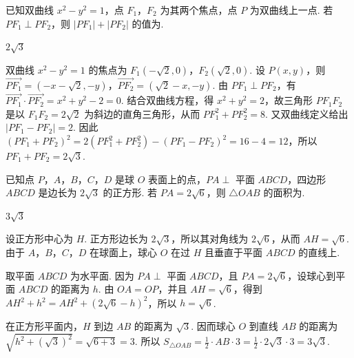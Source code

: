 \begin{problem}
已知双曲线 \(x^{2} - y^{2} = 1\)，点 \(F_{1}\)，\(F_{2}\) 为其两个焦点，点 \(P\) 为双曲线上一点. 若 \(PF_{1} \perp PF_{2}\)，则 \(|PF_{1}| + |PF_{2}|\) 的值为\fillinblank{}.
\end{problem}

\begin{answer}
\(2\sqrt{3}\)
\end{answer}

\begin{solution}
双曲线 \(x^2-y^2=1\) 的焦点为 \(F_1\left(-\sqrt{2},0\right)\)，\(F_2\left(\sqrt{2},0\right)\). 设 \(P(x,y)\)，则
\(\overrightarrow{PF_1}=\left(-x-\sqrt{2},-y\right)\)，\(\overrightarrow{PF_2}=\left(\sqrt{2}-x,-y\right)\). 由 \(PF_1\perp PF_2\)，有
\(\overrightarrow{PF_1}\cdot\overrightarrow{PF_2}=x^2+y^2-2=0\). 结合双曲线方程，得 \(x^2+y^2=2\)，故三角形 \(PF_1F_2\) 是以 \(F_1F_2=2\sqrt{2}\) 为斜边的直角三角形，从而 \(PF_1^2+PF_2^2=8\). 又双曲线定义给出 \(\left|PF_1-PF_2\right|=2\). 因此 \(\left(PF_1+PF_2\right)^2=2\left(PF_1^2+PF_2^2\right)-\left(PF_1-PF_2\right)^2=16-4=12\)，所以 \(PF_1+PF_2=2\sqrt{3}\).
\end{solution}

\begin{problem}
已知点 \(P\)，\(A\)，\(B\)，\(C\)，\(D\) 是球 \(O\) 表面上的点，\(PA \perp\) 平面 \(ABCD\)，四边形 \(ABCD\) 是边长为 \(2\sqrt{3}\) 的正方形. 若 \(PA = 2\sqrt{6}\)，则 \(\triangle OAB\) 的面积为\fillinblank{}.
\end{problem}

\begin{answer}
\(3\sqrt{3}\)
\end{answer}

\begin{solution}
设正方形中心为 \(H\). 正方形边长为 \(2\sqrt{3}\)，所以其对角线为 \(2\sqrt{6}\)，从而 \(AH=\sqrt{6}\). 由于 \(A\)，\(B\)，\(C\)，\(D\) 在球面上，球心 \(O\) 在过 \(H\) 且垂直于平面 \(ABCD\) 的直线上.

取平面 \(ABCD\) 为水平面. 因为 \(PA\perp\) 平面 \(ABCD\)，且 \(PA=2\sqrt{6}\)，设球心到平面 \(ABCD\) 的距离为 \(h\). 由 \(OA=OP\)，并且 \(AH=\sqrt{6}\)，得到 \(\displaystyle AH^2+h^2=AH^2+(2\sqrt{6}-h)^2\)，所以 \(h=\sqrt{6}\).

在正方形平面内，\(H\) 到边 \(AB\) 的距离为 \(\sqrt{3}\). 因而球心 \(O\) 到直线 \(AB\) 的距离为 \(\sqrt{h^2+\left(\sqrt{3}\right)^2}=\sqrt{6+3}=3\). 所以 \(S_{\triangle OAB}=\frac12\cdot AB\cdot3=\frac12\cdot2\sqrt{3}\cdot3=3\sqrt{3}\).
\end{solution}

